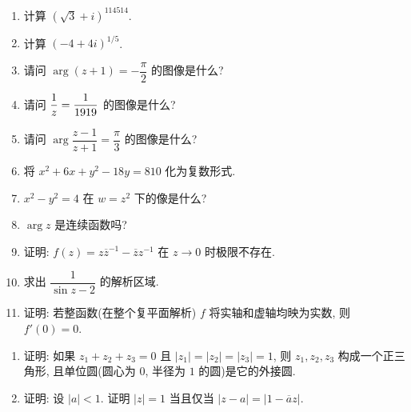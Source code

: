 \documentclass[simple]{hfutexam}
\let\Re\relax
\DeclareMathOperator\Re{Re}
\newcommand\ov[1]{\overline{#1}}
\newcommand\ra{\rightarrow}
\begin{document}
\maketitle


\begin{enumerate}
\item 计算 $(\sqrt{3}+i)^{114514}$.
\item 计算 $(-4+4i)^{1/5}$.
\item 请问 $\arg(z+1)=-\dfrac{\pi}2$ 的图像是什么? 
\item 请问 $\Re\dfrac{1}{z}=\dfrac{1}{1919}$ 的图像是什么?
\item 请问 $\arg\dfrac{z-1}{z+1}=\dfrac{\pi}{3}$ 的图像是什么?
\item 将 $x^2+6x+y^2-18y=810$ 化为复数形式.
\item $x^2-y^2=4$ 在 $w=z^2$ 下的像是什么?
\item $\arg z$ 是连续函数吗?
\item 证明: $f(z)=z{\ov z}^{-1}-\ov zz^{-1}$ 在 $z\ra 0$ 时极限不存在.
\item 求出 $\dfrac{1}{\sin z-2}$ 的解析区域.
\item 证明: 若整函数(在整个复平面解析) $f$ 将实轴和虚轴均映为实数, 则 $f'(0)=0$.
\end{enumerate}

\begin{enumerate}
\item 证明: 如果 $z_1+z_2+z_3=0$ 且 $|z_1|=|z_2|=|z_3|=1$, 则 $z_1,z_2,z_3$ 构成一个正三角形, 且单位圆(圆心为 $0$, 半径为 $1$ 的圆)是它的外接圆.
\item 证明: 设 $|a|<1$. 证明 $|z|=1$ 当且仅当 $|z-a|=|1-\ov az|$.
\end{enumerate}

\end{document}

